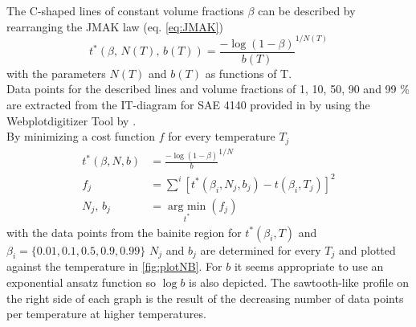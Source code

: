 The C-shaped lines of constant volume fractions $\beta$ can be described by rearranging the JMAK law (eq. \ref{eq:JMAK}) 
\begin{equation}
	t^{\ast}(\beta,\, N(T),\, b(T)) = \frac{-\log(1-\beta)}{b(T)}^{1/N(T)}
\end{equation}
with the parameters $N(T)$ and $b(T)$ as functions of T. \\
Data points for the described lines and volume fractions of 1, 10, 50, 90 and 99 \% are extracted from the IT-diagram for SAE 4140 provided in \cite{vander_voort_atlas_1991} by using the Webplotdigitizer Tool by \cite{rohatgi_webplotdigitizer_2022}.\\ 
By minimizing a cost function $f$ for every temperature $T_j$ %
\begin{align}
	t^\ast(\beta,N,b) &= \frac{-\log(1-\beta)}{b}^{1/N}\\
	f_j &= \sum^i \left[ t^\ast(\beta_{i},N_j,b_j) - t(\beta_{i},T_j)\right]^2\\
	N_j,\, b_j &= \underset{t^\ast}{\operatorname{arg~min}} (f_j)
\end{align}
with the data points from the bainite region for $t^{\ast}(\beta_{i},T)$ and $\beta_i = \{0.01,0.1,0.5,0.9,0.99\}$ 
$N_j$ and $b_j$ are determined for every $T_j$ and plotted against the temperature in \ref{fig:plotNB}.
For $b$ it seems appropriate to use an exponential ansatz function so $\log{b}$ is also depicted. The sawtooth-like profile on the right side of each graph is the result of the decreasing number of data points per temperature at higher temperatures. 






